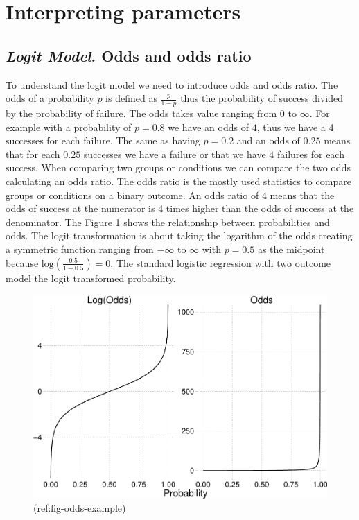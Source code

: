 \documentclass[
  man,floatsintext]{apa6}
\begin{document}
\section{Interpreting parameters}\label{interpreting-parameters}

\subsection{\texorpdfstring{\emph{Logit Model}. Odds and odds ratio}{Logit Model. Odds and odds ratio}}\label{logit-model.-odds-and-odds-ratio}

To understand the logit model we need to introduce odds and odds ratio. The odds of a probability \(p\) is defined as \(\frac{p}{1 - p}\) thus the probability of success divided by the probability of failure. The odds takes value ranging from 0 to \(\infty\). For example with a probability of \(p = 0.8\) we have an odds of \(4\), thus we have a 4 successes for each failure. The same as having \(p = 0.2\) and an odds of \(0.25\) means that for each \(0.25\) successes we have a failure or that we have \(4\) failures for each success. When comparing two groups or conditions we can compare the two odds calculating an odds ratio. The odds ratio is the mostly used statistics to compare groups or conditions on a binary outcome. An odds ratio of \(4\) means that the odds of success at the numerator is 4 times higher than the odds of success at the denominator. The Figure \ref{fig:fig-odds-example} shows the relationship between probabilities and odds. The logit transformation is about taking the logarithm of the odds creating a symmetric function ranging from \(-\infty\) to \(\infty\) with \(p = 0.5\) as the midpoint because \(\text{log}(\frac{0.5}{1 - 0.5}) = 0\). The standard logistic regression with two outcome model the logit transformed probability.

\scriptsize

\begin{figure}

{\centering \includegraphics{paper-new_files/figure-latex/fig-odds-example-1} 

}

\caption{(ref:fig-odds-example)}\label{fig:fig-odds-example}
\end{figure}
\end{document}

